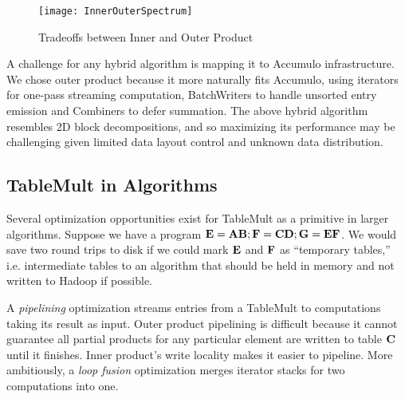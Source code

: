 \begin{figure}[htb]
\vspace{-6pt}
\centering
\texttt{[image: InnerOuterSpectrum]}
\vspace{-16pt}
\caption{Tradeoffs between Inner and Outer Product}
\label{fInnerOuterSpectrum}
\vspace{-6pt}
\end{figure}


A challenge for any hybrid algorithm is mapping it to Accumulo infrastructure.
We chose outer product because it more naturally fits Accumulo, 
using iterators for one-pass streaming computation, 
BatchWriters to handle unsorted entry emission and Combiners to defer summation.
The above hybrid algorithm resembles 2D block decompositions,
and so maximizing its performance may be challenging 
given limited data layout control and unknown data distribution.


\subsection{TableMult in Algorithms}
Several optimization opportunities exist for TableMult as a primitive in larger algorithms.
Suppose we have a program $\mathbf{E} = \mathbf{AB}; \mathbf{F} = \mathbf{CD}; \mathbf{G} = \mathbf{EF}$.
We would save two round trips to disk if we could mark $\mathbf{E}$ and $\mathbf{F}$ as 
``temporary tables,'' i.e. intermediate tables to an algorithm that should be held in memory 
and not written to Hadoop if possible.

A \emph{pipelining} optimization streams entries from a TableMult 
to computations taking its result as input. 
Outer product pipelining is difficult
because it cannot guarantee all partial products for any particular element 
are written to table $\mathbf{C}$ until it finishes.
Inner product's write locality makes it easier to pipeline.
More ambitiously, a \emph{loop fusion} optimization merges iterator stacks 
for two computations into one. 

